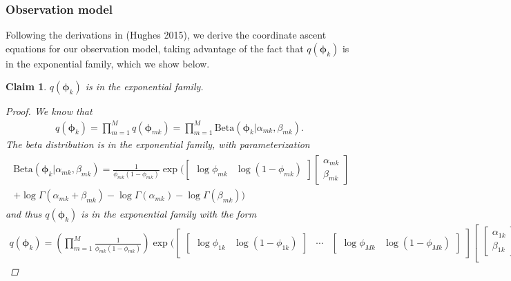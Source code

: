 \documentclass[11pt]{article}
\newtheorem{claim}{Claim}
\begin{document}
\subsubsection{Observation model}
Following the derivations in (Hughes 2015), we derive the coordinate ascent equations for our observation model, taking advantage of the fact that $q(\bm{\phi}_k)$ is in the exponential family, which we show below.

\begin{claim}
$q(\bm{\phi}_k)$ is in the exponential family.
\begin{proof}
We know that
\begin{align*}
q(\bm{\phi}_k)  = \prod\limits_{m=1}^M q(\bm{\phi}_{mk}) = \prod\limits_{m=1}^M \mathrm{Beta}(\bm{\phi}_k | \alpha_{mk}, \beta_{mk}).
\end{align*}
The beta distribution is in the exponential family, with parameterization 
\begin{align}
\begin{split}
\mathrm{Beta}(\bm{\phi}_k |  \alpha_{mk}, \beta_{mk}) =  \frac{1}{\phi_{mk}(1 - \phi_{mk})} \exp \bigg(
		\begin{bmatrix}
			\log\phi_{mk} & \log(1 - \phi_{mk})
		\end{bmatrix}
		\begin{bmatrix}
			\alpha_{mk} \\ \beta_{mk}
		\end{bmatrix} \\
+ \log \Gamma(\alpha_{mk} + \beta_{mk}) - \log \Gamma(\alpha_{mk}) - \log\Gamma(\beta_{mk}) \bigg)
\end{split}
\end{align}
and thus $q(\bm{\phi}_k)$ is in the exponential family with the form
\begin{align*}
q(\bm{\phi}_k) = \left(\prod\limits_{m=1}^M \frac{1}{\phi_{mk}(1 - \phi_{mk})} \right) \exp\bigg(
			\begin{bmatrix}
				\begin{bmatrix}
				 \log\phi_{1k} & \log(1 - \phi_{1k} )
				\end{bmatrix} & \cdots &
				\begin{bmatrix}
				 \log\phi_{Mk} & \log(1 - \phi_{Mk})
				\end{bmatrix}
			\end{bmatrix}
			\begin{bmatrix}
				\begin{bmatrix}
				\alpha_{1k} \\ \beta_{1k} 
				\end{bmatrix} \\

\end{bmatrix}
\end{align*}
\end{proof}
\end{claim}
\end{document}
